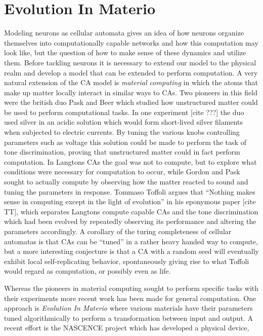 \section{Evolution In Materio}
Modeling neurons as cellular automata gives an idea of how neurons organize
themselves into computationally capable networks and how this computation may
look like, but the question of how to make sense of these dynamics and utilize
them.
Before tackling neurons it is necessary to extend our model to the physical
realm and develop a model that can be extended to perform computation.
A very natural extension of the CA model is \emph{material computing} in which
the atoms that make up matter locally interact in similar ways to CAs.
%
Two pioneers in this field were the british duo Pask and Beer which studied how
unstructured matter could be used to perform computational tasks.
%
In one experiment [cite ???] the duo used silver in an acidic solution which
would form short-lived silver filaments when subjected to electric currents.
%
By tuning the various knobs controlling parameters such as voltage this solution
could be made to perform the task of tone discrimination, proving that
unstructured matter could in fact perform computation.
%
In Langtons CAs the goal was not to compute, but to explore what conditions were
necessary for computation to occur, while Gordon and Pask sought to actually
compute by observing how the matter reacted to sound and tuning the parameters
in response.
%
Tommaso Toffoli argues that ``Nothing makes sense in computing except in the
light of evolution'' in his eponymous paper [cite TT], which separates Langtons
compute capable CAs and the tone discrimination which had been evolved by
repeatedly observing its performance and altering the parameters accordingly.
%
A corollary of the turing completeness of cellular automatas is that CAs can be
``tuned'' in a rather heavy handed way to compute, but a more interesting
conjecture is that a CA with a random seed will eventually exhibit local
self-replicating behavior, spontaneously giving rise to what Toffoli would
regard as computation, or possibly even as life.\par
%
Whereas the pioneers in material computing sought to perform specific tasks with
their experiments more recent work has been made for general computation.
One approach is \emph{Evolution In Materio} where various materials have their
parameters tuned algorithmically to perform a transformation between input and
output.
A recent effort is the NASCENCE project which has developed a physical device,
